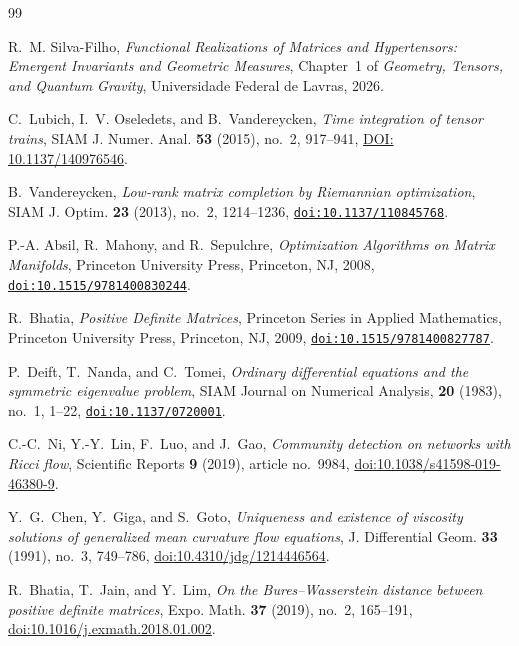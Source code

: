 \documentclass[11pt,a4paper,reqno]{amsart}
\theoremstyle{definition}
\numberwithin{equation}{section}
\providecommand{\doi}[1]{\href{https://doi.org/#1}{\texttt{doi:#1}}}
\begin{document}
\begin{thebibliography}{99}

 R.~M. Silva-Filho, \emph{Functional Realizations of Matrices and Hypertensors: Emergent Invariants and Geometric Measures}, Chapter~1 of \emph{Geometry, Tensors, and Quantum Gravity}, Universidade Federal de Lavras, 2026.


C.~Lubich, I.~V. Oseledets, and B.~Vandereycken,
\emph{Time integration of tensor trains},
SIAM J. Numer. Anal. \textbf{53} (2015), no.~2, 917--941,
\href{https://doi.org/10.1137/140976546}{DOI: 10.1137/140976546}.

B.~Vandereycken,
\emph{Low-rank matrix completion by Riemannian optimization},
SIAM J. Optim. \textbf{23} (2013), no.~2, 1214--1236,
\doi{10.1137/110845768}.

P.-A. Absil, R.~Mahony, and R.~Sepulchre,
\emph{Optimization Algorithms on Matrix Manifolds},
Princeton University Press, Princeton, NJ, 2008,
\doi{10.1515/9781400830244}.

R.~Bhatia,
\emph{Positive Definite Matrices},
Princeton Series in Applied Mathematics, Princeton University Press, Princeton, NJ, 2009,
\doi{10.1515/9781400827787}.

P.~Deift, T.~Nanda, and C.~Tomei,
\emph{Ordinary differential equations and the symmetric eigenvalue problem},
SIAM Journal on Numerical Analysis, \textbf{20} (1983), no.~1, 1--22,
\doi{10.1137/0720001}.

C.-C.~Ni, Y.-Y.~Lin, F.~Luo, and J.~Gao,
\emph{Community detection on networks with Ricci flow},
Scientific Reports \textbf{9} (2019), article no.~9984,
\href{https://doi.org/10.1038/s41598-019-46380-9}{doi:10.1038/s41598-019-46380-9}.

Y.~G.~Chen, Y.~Giga, and S.~Goto,
\emph{Uniqueness and existence of viscosity solutions of generalized mean curvature flow equations},
J. Differential Geom. \textbf{33} (1991), no.~3, 749--786,
\href{https://doi.org/10.4310/jdg/1214446564}{doi:10.4310/jdg/1214446564}.

R.~Bhatia, T.~Jain, and Y.~Lim,
\emph{On the Bures--Wasserstein distance between positive definite matrices},
Expo. Math. \textbf{37} (2019), no.~2, 165--191,
\href{https://doi.org/10.1016/j.exmath.2018.01.002}{doi:10.1016/j.exmath.2018.01.002}.


\end{thebibliography}
\end{document}
